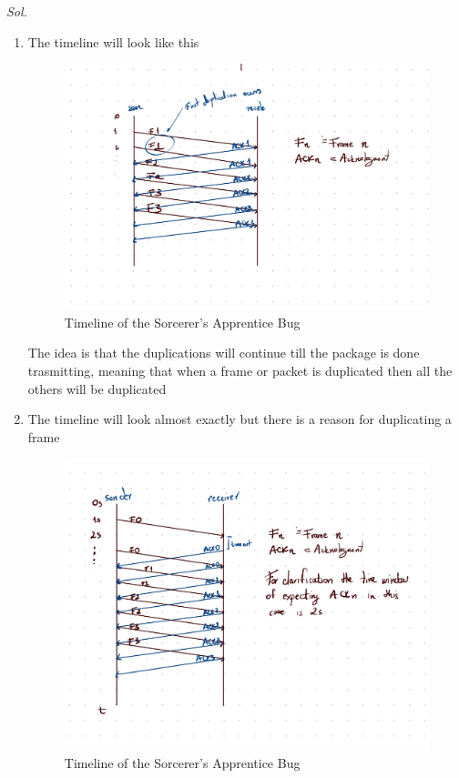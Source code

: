 \documentclass{assignment}
\begin{document}
\textit{ Sol. }
\begin{enumerate}
  \item The timeline will look like this
  \begin{figure}[h]
  \begin{center}
    \includegraphics[scale=0.3]{1.JPG}
  \end{center}
  \caption{Timeline of the Sorcerer's Apprentice Bug}
  \label{fig:}
  \end{figure}

  The idea is that the duplications will continue till the package is done
  trasmitting, meaning that when a frame or packet is duplicated then all the
  others will be duplicated
\newpage
\item The timeline will look almost exactly but there is a reason for
  duplicating a frame
  \begin{figure}[h]
  \begin{center}
    \includegraphics[scale=0.3]{2.JPG}
  \end{center}
  \caption{Timeline of the Sorcerer's Apprentice Bug}
  \label{fig:2}
  \end{figure}


\end{enumerate}
\end{document}
